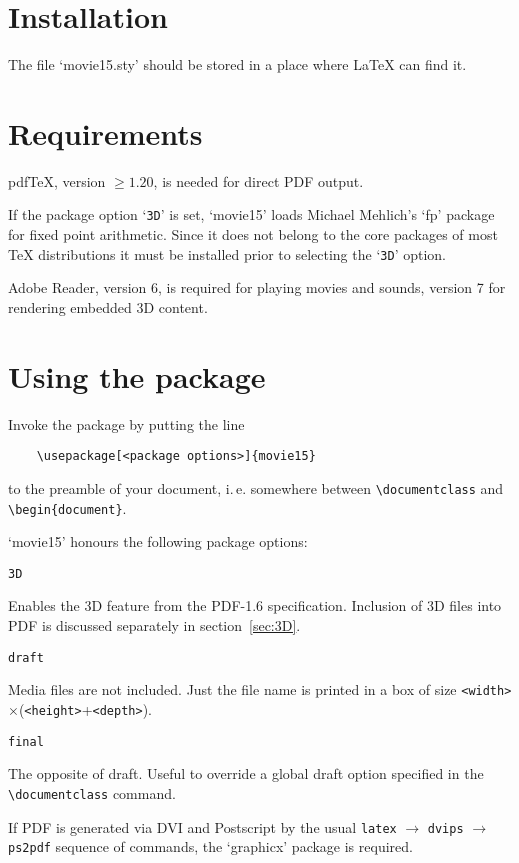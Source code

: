 \documentclass[a4paper]{article}
\begin{document}
\section{Installation}
The file `movie15.sty' should be stored in a place where \LaTeX{} can find it.

\section{Requirements}
pdf\TeX{}, version $\ge1.20$, is needed for direct PDF output.

If the package option `\verb+3D+' is set, `movie15' loads Michael Mehlich's `fp' package for fixed point arithmetic. Since it does not belong to the core packages of most \TeX{} distributions it must be installed prior to selecting the `\verb+3D+' option.

Adobe Reader, version 6, is required for playing movies and sounds, version 7 for rendering embedded 3D content.

\section{Using the package}
Invoke the package by putting the line
\begin{verbatim}
    \usepackage[<package options>]{movie15}
\end{verbatim}
to the preamble of your document, i.\,e. somewhere between \verb+\documentclass+ and \verb+\begin{document}+.

`movie15' honours the following package options:
\begin{verbatim}
3D
\end{verbatim}
Enables the 3D feature from the PDF-1.6 specification. Inclusion of 3D files into PDF is discussed separately in section~\ref{sec:3D}.

\begin{verbatim}
draft
\end{verbatim}
Media files are not included. Just the file name is printed in a box of size \verb+<width>+$\times$(\verb+<height>++\verb+<depth>+).
\begin{verbatim}
final
\end{verbatim}
The opposite of draft. Useful to override a global draft option specified
in the \verb+\documentclass+ command.

If PDF is generated via DVI and Postscript by the usual \verb+latex+ $\rightarrow$ \verb+dvips+ $\rightarrow$ \verb+ps2pdf+ sequence of commands, the `graphicx' package is required.
\end{document}
